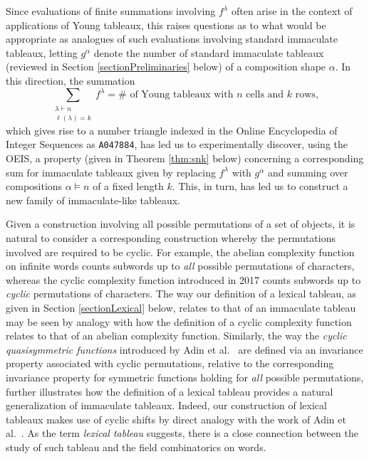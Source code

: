 \documentclass{amsart}
\theoremstyle{definition}
\begin{document}
 Since evaluations of finite summations involving $f^{\lambda}$ often arise in the context of applications of Young tableaux, this raises 
 questions as to what would be appropriate as analogues of such evaluations involving standard immaculate tableaux, 
 letting $g^{\alpha}$ denote the number of standard immaculate tableaux 
 (reviewed in Section \ref{sectionPreliminaries} below) of a composition shape $\alpha$.
 In this direction, 
 the summation
\begin{equation}\label{krows}
 \sum_{\substack{ \lambda \vdash n \\ \ell(\lambda)=k}} f^{\lambda} = \text{$\#$ of Young tableaux with $n$ cells and $k$ rows}, 
\end{equation} 
 which gives rise to a number triangle indexed in the Online Encyclopedia of Integer Sequences as {\tt A047884}, has led us to 
 experimentally discover, using the OEIS, a property (given in Theorem \ref{thm:snk} below) 
 concerning a corresponding sum for immaculate tableaux
 given by replacing $f^{\lambda}$ with $g^{\alpha}$ and summing over compositions $\alpha \vDash n$
 of a fixed length $k$. 
 This, in turn, has led us to construct a new family of immaculate-like tableaux.
 
 Given a construction involving all possible permutations of a set of objects, it is natural to consider a corresponding construction whereby 
 the permutations involved are required to be cyclic. For example, the abelian complexity function on infinite words counts subwords up 
 to \emph{all} possible permutations of characters, whereas the cyclic complexity function introduced in 2017 
 \cite{CassaigneFiciSciortinoZamboni2017} counts subwords up to \emph{cyclic} permutations of characters. The way our definition of a 
 lexical tableau, as given in Section \ref{sectionLexical} below, 
 relates to that of an immaculate tableau may be seen by analogy with how the definition of a cyclic complexity function 
 relates to that of an abelian complexity function. Similarly, the way the \emph{cyclic quasisymmetric functions} introduced by Adin et 
 al.\ \cite{AdinGesselReinerRoichman2021} are defined via an invariance property associated with cyclic permutations, relative to the 
 corresponding invariance property for symmetric functions holding for \emph{all} possible permutations, further illustrates how the 
 definition of a lexical tableau provides a natural generalization of immaculate tableaux. Indeed, our construction of lexical tableaux 
 makes use of cyclic shifts by direct analogy with the work of Adin et al.\ \cite{AdinGesselReinerRoichman2021}. As the term \emph{lexical 
 tableau} suggests, there is a close connection between the study of such tableau and the field combinatorics on words. 
\end{document}
